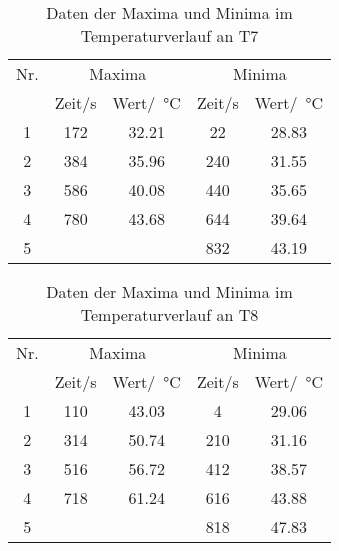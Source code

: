 \begin{table}
  \centering
  \begin{tabular}{c|c|c|c|c}
    \toprule
    Nr. &\multicolumn{2}{c}{Maxima} & \multicolumn{2}{c}{Minima}\\
         &Zeit/s & Wert/\SI{}{\degreeCelsius} & Zeit/s & Wert/\SI{}{\degreeCelsius}\\
    \midrule
    1 & 172 & 32.21&22   &28.83\\
    2 & 384& 35.96&240 &31.55\\
    3 & 586 & 40.08&440&35.65\\
    4 & 780 & 43.68&644&39.64\\
    5 &      &         &832&43.19\\
    \bottomrule
  \end{tabular}
  \caption{Daten der Maxima und Minima im Temperaturverlauf an T7}
  \label{tab:daten_t7}
\end{table}

\begin{table}
  \centering
  \begin{tabular}{c|c|c|c|c}
    \toprule
    Nr. &\multicolumn{2}{c}{Maxima} & \multicolumn{2}{c}{Minima}\\
         &Zeit/s & Wert/\SI{}{\degreeCelsius} & Zeit/s & Wert/\SI{}{\degreeCelsius}\\
    \midrule
    1 & 110 & 43.03&4   &29.06\\
    2 & 314& 50.74&210 &31.16\\
    3 & 516 & 56.72&412&38.57\\
    4 & 718 & 61.24&616&43.88\\
    5 &      &         &818&47.83\\
    \bottomrule
  \end{tabular}
  \caption{Daten der Maxima und Minima im Temperaturverlauf an T8}
  \label{tab:daten_t8}
\end{table}

